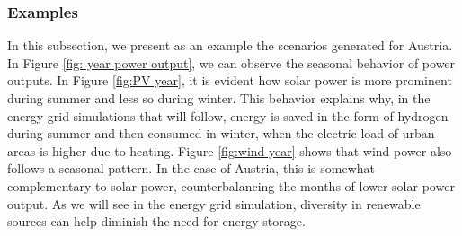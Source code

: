\documentclass[english]{article}
\numberwithin{definition}{section}
\numberwithin{theorem}{section}
\numberwithin{problem}{section}
\begin{document}
\subsubsection{Examples}
In this subsection, we present as an example the scenarios generated for Austria. In Figure \ref{fig: year power output}, we can observe the seasonal behavior of power outputs. In Figure \ref{fig:PV year}, it is evident how solar power is more prominent during summer and less so during winter. This behavior explains why, in the energy grid simulations that will follow, energy is saved in the form of hydrogen during summer and then consumed in winter, when the electric load of urban areas is higher due to heating. Figure \ref{fig:wind year} shows that wind power also follows a seasonal pattern. In the case of Austria, this is somewhat complementary to solar power, counterbalancing the months of lower solar power output. As we will see in the energy grid simulation, diversity in renewable sources can help diminish the need for energy storage.
\end{document}
